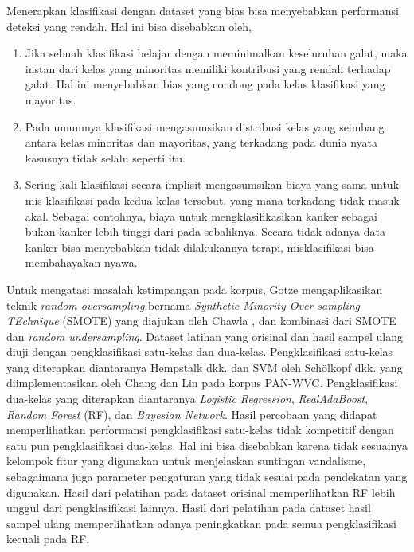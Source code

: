 \newpage
Menerapkan klasifikasi dengan dataset yang bias bisa menyebabkan performansi
deteksi yang rendah.
Hal ini bisa disebabkan oleh,
\begin{enumerate}
	\item Jika sebuah klasifikasi belajar dengan meminimalkan keseluruhan
	galat, maka instan dari kelas yang minoritas memiliki kontribusi yang
	rendah terhadap galat.
	Hal ini menyebabkan bias yang condong pada kelas klasifikasi yang
	mayoritas.
	\item Pada umumnya klasifikasi mengasumsikan distribusi kelas yang
	seimbang antara kelas minoritas dan mayoritas, yang terkadang pada
	dunia nyata kasusnya tidak selalu seperti itu.
	\item Sering kali klasifikasi secara implisit mengasumsikan biaya yang
	sama untuk mis-klasifikasi pada kedua kelas tersebut, yang mana
	terkadang tidak masuk akal.
	Sebagai contohnya, biaya untuk mengklasifikasikan kanker sebagai bukan
	kanker lebih tinggi dari pada sebaliknya.
	Secara tidak adanya data kanker bisa menyebabkan tidak dilakukannya
	terapi, misklasifikasi bisa membahayakan nyawa.
\end{enumerate}

Untuk mengatasi masalah ketimpangan pada korpus, Gotze
\cite{gotze2014advanced}
mengaplikasikan teknik
\textit{random oversampling}
bernama
\textit{Synthetic Minority Over-sampling TEchnique} (SMOTE)
yang diajukan oleh Chawla
\cite{chawla2002smote},
dan kombinasi dari SMOTE dan
\textit{random undersampling}.
Dataset latihan yang orisinal dan hasil sampel ulang diuji dengan
pengklasifikasi satu-kelas dan dua-kelas.
Pengklasifikasi satu-kelas yang diterapkan diantaranya Hempstalk dkk.
\cite{hempstalk2008one}
dan SVM oleh Schölkopf dkk.
\cite{scholkopf1999support}
yang diimplementasikan oleh Chang dan Lin
\cite{chang2011libsvm}
pada korpus PAN-WVC.
Pengklasifikasi dua-kelas yang diterapkan diantaranya
\textit{Logistic Regression},
\textit{RealAdaBoost},
\textit{Random Forest} (RF), dan
\textit{Bayesian Network}.
Hasil percobaan yang didapat memperlihatkan performansi pengklasifikasi
satu-kelas tidak kompetitif dengan satu pun pengklasifikasi dua-kelas.
Hal ini bisa disebabkan karena tidak sesuainya kelompok fitur yang digunakan
untuk menjelaskan suntingan vandalisme, sebagaimana juga parameter pengaturan
yang tidak sesuai pada pendekatan yang digunakan.
Hasil dari pelatihan pada dataset orisinal memperlihatkan RF
lebih unggul dari pengklasifikasi lainnya.
Hasil dari pelatihan pada dataset hasil sampel ulang memperlihatkan adanya
peningkatkan pada semua pengklasifikasi kecuali pada RF.

